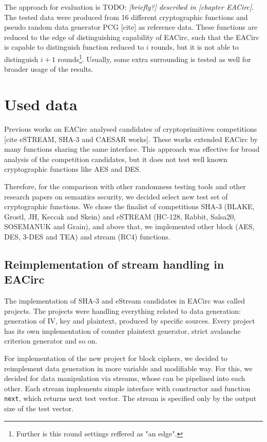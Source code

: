 \documentclass[
  print, %
  Table,   %
  nolof,     %
  nolot,     %
  11pt, %
  oneside  %
]{fithesis3}
\newcommand{\todo}[1]{TODO: \textit{#1}}
\begin{document}
The approach for evaluation is \todo{[briefly?] described in [chapter EACirc]}. The tested data were produced from 16 different cryptographic functions and pseudo random data generator PCG [cite] as reference data. These functions are reduced to the edge of distinguishing capability of EACirc, such that the EACirc is capable to distinguish function reduced to $i$ rounds, but it is not able to distinguish $i+1$ rounds\footnote{Further is this round settings reffered as "an edge".}. Usually, some extra surrounding is tested as well for broader usage of the results.

\section{Used data}

Previous works on EACirc analysed candidates of cryptoprimitives competitions [cite eSTREAM, SHA-3 and CAESAR works]. These works extended EACirc by many functions sharing the same interface. This approach was effective for broad analysis of the competition candidates, but it does not test well known cryptographic functions like AES and DES.

Therefore, for the comparison with other randomness testing tools and other research papers on semantics security, we decided select new test set of cryptographic functions. We chose the finalist of competitions SHA-3 (BLAKE, Grostl, JH, Keccak and Skein) and eSTREAM (HC-128, Rabbit, Salsa20, SOSEMANUK and Grain), and above that, we implemented other block (AES, DES, 3-DES and TEA) and stream (RC4) functions.

\subsection{Reimplementation of stream handling in EACirc}

The implementation of SHA-3 and eStream candidates in EACirc was called projects. The projects were handling everything related to data generation: generation of IV, key and plaintext, produced by specific sources. Every project has its own implementation of counter plaintext generator, strict avalanche criterion generator and so on.

For implementation of the new project for block ciphers, we decided to reimplement data generation in more variable and modifiable way. For this, we decided for data manipulation via streams, whose can be pipelined into each other. Each stream implements simple interface with constructor and function \texttt{next}, which returns next test vector. The stream is specified only by the output size of the test vector.
\end{document}
